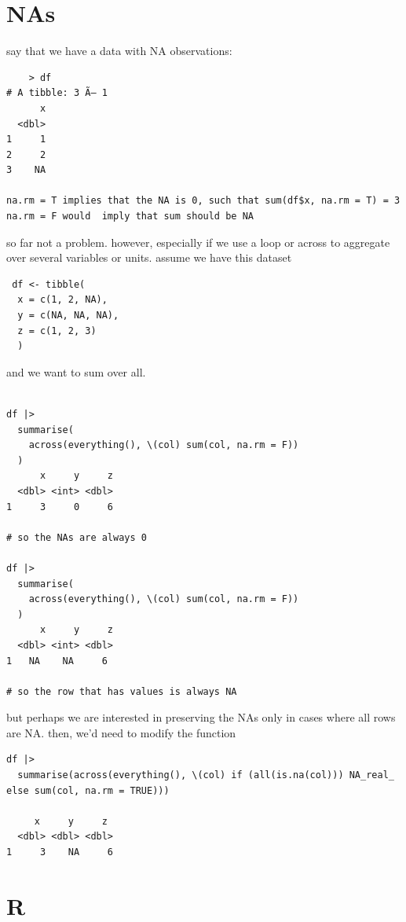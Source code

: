 \section{NAs}
say that we have a data with NA observations:
\begin{verbatim}
    > df
# A tibble: 3 Ã— 1
      x
  <dbl>
1     1
2     2
3    NA

na.rm = T implies that the NA is 0, such that sum(df$x, na.rm = T) = 3
na.rm = F would  imply that sum should be NA

\end{verbatim}
so far not a problem.
however, especially if we use a loop or across to aggregate over several variables or units. assume we have this dataset
\begin{verbatim}
 df <- tibble(
  x = c(1, 2, NA),
  y = c(NA, NA, NA),
  z = c(1, 2, 3)
  )
\end{verbatim}
and we want to sum over all. 
\begin{verbatim}

df |> 
  summarise(
    across(everything(), \(col) sum(col, na.rm = F))
  )
      x     y     z
  <dbl> <int> <dbl>
1     3     0     6

# so the NAs are always 0

df |> 
  summarise(
    across(everything(), \(col) sum(col, na.rm = F))
  )
      x     y     z
  <dbl> <int> <dbl>
1   NA    NA     6

# so the row that has values is always NA

\end{verbatim}

but perhaps we are interested in preserving the NAs only in cases where all rows are NA. then, we'd need to modify the function

\begin{verbatim}
df |> 
  summarise(across(everything(), \(col) if (all(is.na(col))) NA_real_ else sum(col, na.rm = TRUE)))

     x     y     z
  <dbl> <dbl> <dbl>
1     3    NA     6
\end{verbatim}

\section{R}

